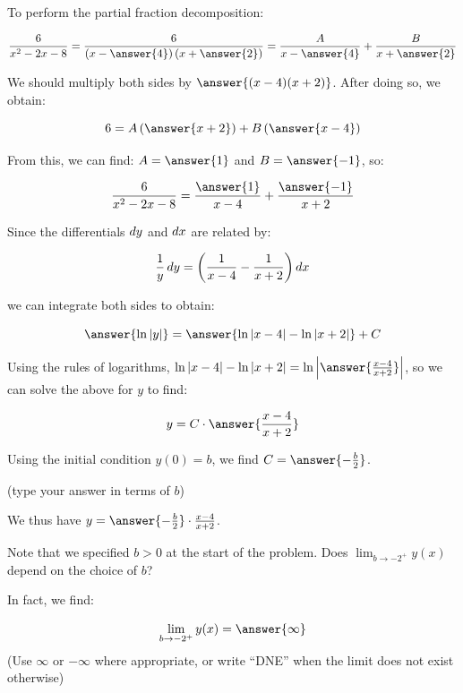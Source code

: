 \documentclass{ximera}
\begin{document}
\begin{exercise}
\begin{exercise}
\begin{hint}
\begin{question}
To perform the partial fraction decomposition:

\[
\frac{6}{x^2-2x-8} = \frac{6}{\left(x-\answer{4}\right)\left(x+\answer{2}\right)} = \frac{A}{x-\answer{4}}+\frac{B}{x+\answer{2}}
\]

We should multiply both sides by $\answer{(x-4)(x+2)}$.  After doing so, we obtain:

\[
6=A\left(\answer{x+2}\right)+B\left(\answer{x-4}\right)
\]

From this, we can find: $A=\answer{1}$ and $B=\answer{-1}$, so:

\[
\frac{6}{x^2-2x-8} = \frac{\answer{1}}{x-4}+\frac{\answer{-1}}{x+2}
\]


\begin{question}
Since the differentials $\mathop{}\!d y$ and $\mathop{}\!d x$ are related by:

\[
\frac{1}{y}  \mathop{}\!d y = \left(\frac{1}{x-4}-\frac{1}{x+2} \right) \mathop{}\!d x
\]

we can integrate both sides to obtain:

\[
\answer{\ln|y|} = \answer{\ln|x-4| - \ln|x+2|} +C\\
\]

Using the rules of logarithms, $ \ln|x-4| - \ln|x+2| =  \ln\left| \answer{\frac{x-4}{x+2}} \right|$, so we can solve the above for $y$ to find:

\[
y= C \cdot \answer{\frac{x-4}{x+2}} \\
\]
  
\begin{question}  
Using the initial condition $y(0)=b$, we find $C=\answer{-\frac{b}{2}}$.

(type your answer in terms of $b$)

We thus have $y = \answer{-\frac{b}{2}} \cdot \frac{x-4}{x+2}$.


\end{question}
\end{question}
\end{question}
 \end{hint}
 
\begin{exercise}
Note that we specified $b>0$ at the start of the problem.  Does $\lim_{b \to -2^+} y(x)$ depend on the choice of $b$?
\begin{multipleChoice}
\end{multipleChoice}
In fact, we find:

\[
\lim_{b \to -2^+} y(x) = \answer{\infty}
\]
(Use $\infty$ or $-\infty$ where appropriate, or write ``DNE'' when the limit does not exist otherwise)
\end{exercise}
 \end{exercise}
\end{exercise}
\end{document}
